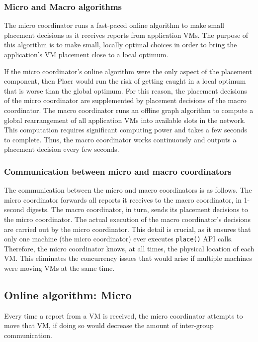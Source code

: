 \documentclass[11pt]{article}
\begin{document}
\subsubsection{Micro and Macro algorithms}

The micro coordinator runs a fast-paced online algorithm to make small placement decisions as it receives reports from application VMs.  The purpose of this algorithm is to make small, locally optimal choices in order to bring the application's VM placement close to a local optimum.

If the micro coordinator's online algorithm were the only aspect of the placement component, then Placr would run the risk of getting caught in a local optimum that is worse than the global optimum.  For this reason, the placement decisions of the micro coordinator are supplemented by placement decisions of the macro coordinator.  The macro coordinator runs an offline graph algorithm to compute a global rearrangement of all application VMs into available slots in the network.  This computation requires significant computing power and takes a few seconds to complete.  Thus, the macro coordinator works continuously and outputs a placement decision every few seconds.

\subsubsection{Communication between micro and macro coordinators}

The communication between the micro and macro coordinators is as follows.  The micro coordinator forwards all reports it receives to the macro coordinator, in 1-second digests.  The macro coordinator, in turn, sends its placement decisions to the micro coordinator.  The actual execution of the macro coordinator's decisions are carried out by the micro coordinator.  This detail is crucial, as it ensures that only one machine (the micro coordinator) ever executes {\tt place()} API calls.  Therefore, the micro coordinator knows, at all times, the physical location of each VM.  This eliminates the concurrency issues that would arise if multiple machines were moving VMs at the same time.


\subsection{Online algorithm: Micro}
\newcommand{\VMa}{\textit{VM}_a}
\newcommand{\VMb}{\textit{VM}_b}
Every time a report from a VM is received, the micro coordinator attempts to move that VM, if doing so would decrease the amount of inter-group communication.
\end{document}

